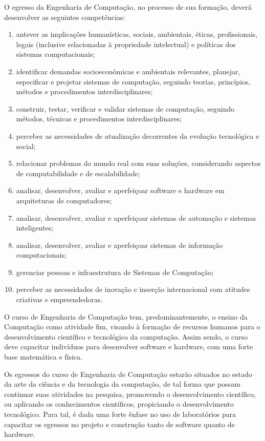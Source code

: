 O egresso da Engenharia de Computação, no processo de sua formação, deverá desenvolver as seguintes competências:
\begin{enumerate} [I -]
    \item antever as implicações humanísticas, sociais, ambientais, éticas, profissionais, legais (inclusive relacionadas à propriedade intelectual) e políticas dos sistemas computacionais;
    \item identificar demandas socioeconômicas e ambientais relevantes, planejar, especificar e projetar sistemas de computação, seguindo teorias, princípios, métodos e procedimentos interdisciplinares;
    \item construir, testar, verificar e validar sistemas de computação, seguindo métodos, técnicas e procedimentos interdisciplinares;
    \item perceber as necessidades de atualização decorrentes da evolução tecnológica e social;
    \item relacionar problemas do mundo real com suas soluções, considerando aspectos de computabilidade e de escalabilidade;
    \item analisar, desenvolver, avaliar e aperfeiçoar software e hardware em arquiteturas de computadores;
    \item analisar, desenvolver, avaliar e aperfeiçoar sistemas de automação e sistemas inteligentes;
    \item analisar, desenvolver, avaliar e aperfeiçoar sistemas de informação computacionais;
    \item gerenciar pessoas e infraestrutura de Sistemas de Computação;
    \item perceber as necessidades de inovação e inserção internacional com atitudes criativas e empreendedoras.
\end{enumerate}

O curso de Engenharia de Computação tem, predominantemente, o ensino da Computação como atividade fim, visando à formação de recursos humanos para o desenvolvimento científico e tecnológico da computação. Assim sendo, o curso deve capacitar indivíduos para desenvolver software e hardware, com uma forte base matemática e física.

Os egressos do curso de Engenharia de Computação estarão situados no estado da arte da ciência e da tecnologia da computação, de tal forma que possam continuar suas atividades na pesquisa, promovendo o desenvolvimento científico, ou aplicando os conhecimentos científicos, propiciando o desenvolvimento tecnológico. Para tal, é dada uma forte ênfase no uso de laboratórios para capacitar os egressos no projeto e construção tanto de software quanto de hardware.

